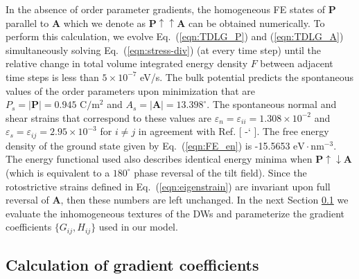 \documentclass[%
 reprint,
superscriptaddress,
 amsmath,amssymb,
prb,
]{revtex4-1}
\newcommand*{\citen}[1]{%
  \begingroup
    \romannumeral-`\x %
    \setcitestyle{numbers}%
    \cite{#1}%
  \endgroup   
}
\begin{document}
%
In the absence of order parameter gradients, the homogeneous FE states of $\mathbf{P}$ parallel to $\mathbf{A}$ which we denote as $\mathbf{P}\uparrow\uparrow\mathbf{A}$ can be obtained numerically.
%
To perform this calculation, we evolve Eq.~(\ref{eqn:TDLG_P}) and (\ref{eqn:TDLG_A}) simultaneously solving Eq.~(\ref{eqn:stress-div}) (at every time step) until the relative change in total volume integrated energy density $F$ between adjacent time steps is less than $5\times 10^{-7}$ eV/s.
%
The bulk potential predicts the spontaneous values of the order parameters upon minimization that are $P_s = |\mathbf{P}| = 0.945 \,\,\mathrm{C}/\mathrm{m}^2$  and $A_s = |\mathbf{A}| = 13.398^\circ$.
%
The spontaneous normal and shear strains that correspond to these values are $\varepsilon_{n} = \varepsilon_{ii} = 1.308\times10^{-2}$ and $\varepsilon_{s} = \varepsilon_{ij} = 2.95\times10^{-3}$ for $i \neq j$ in agreement with Ref. [\citen{Fedorova2022}].
%
The free energy density of the ground state given by Eq.~(\ref{eqn:FE_en}) is -15.5653 $\mathrm{eV}\cdot\mathrm{nm}^{-3}$.
%
The energy functional used also describes identical energy minima when $\mathbf{P}\uparrow\downarrow\mathbf{A}$ (which is equivalent to a $180^\circ$ phase reversal of the tilt field).
%
%
Since the rotostrictive strains defined in Eq.~(\ref{eqn:eigenstrain}) are invariant upon full reversal of $\mathbf{A}$, then these numbers are left unchanged.
%
In the next Section \ref{sec:DWparam} we evaluate the inhomogeneous textures of the DWs and parameterize the gradient coefficients $\{G_{ij}, H_{ij}\}$ used in our model.
%

%
\subsection{Calculation of gradient coefficients}\label{sec:DWparam}
%
\end{document}
